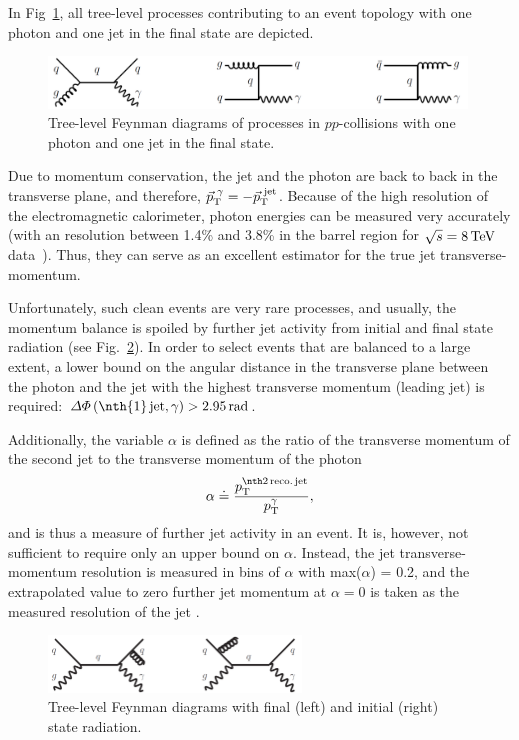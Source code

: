 In Fig~\ref{res:fig:FeynmanDiagrams}, all tree-level processes contributing to an event topology with one photon and one jet in the final state are depicted. 
\begin{figure}[b]
  \centering
      \includegraphics[width=0.99\textwidth]{figures/resolution/generalApproach/FeynmanDiagram.pdf}
  \caption{Tree-level Feynman diagrams of processes in $pp$-collisions with one photon and one jet in the final state.}  
  \label{res:fig:FeynmanDiagrams}
\end{figure}
Due to momentum conservation, the jet and the photon are back to back in the transverse plane, and therefore, $\vec{p}_{\text{T}}^{\,\,\gamma} = -\vec{p}_{\text{T}}^{\,\,\text{jet}}$. 
Because of the high resolution of the electromagnetic calorimeter, photon energies can be measured very accurately (with an resolution between 1.4\% and 3.8\% in the barrel region for $\sqrt{s}=8\,\text{Te}\kern-0.06667em\text{V}$ data~\cite{bib:CMS:PhotonIdentification_8TeV}).
Thus, they can serve as an excellent estimator for the true jet transverse-momentum.


Unfortunately, such clean events are very rare processes, and usually, the momentum balance is spoiled by further jet activity from initial and final state radiation (see Fig.~\ref{res:fig:FeynmanDiagramsWithRadiation}). 
In order to select events that are balanced to a large extent, a lower bound on the angular distance in the transverse plane between the photon and the jet with the highest transverse momentum (leading jet) is required: $\Delta\Phi \left(\text{\nth{1}\,jet,\,} \gamma \right)>2.95\,\unit{rad}$. 

Additionally, the variable $\alpha$ is defined as the ratio of the transverse momentum of the second jet to the transverse momentum of the photon
\begin{equation}
\label{res:eq:alphaDef}
\alpha \doteq \frac{\ptsecondrecojet}{\ptgamma},
\end{equation} 
and is thus a measure of further jet activity in an event. 
It is, however, not sufficient to require only an upper bound on $\alpha$. 
Instead, the jet transverse-momentum resolution is measured in bins of $\alpha$ with max($\alpha$) = 0.2, 
and the extrapolated value to zero further jet momentum at $\alpha=0$ is taken as the measured resolution of the jet \pt. %
\begin{figure}[t]
  \centering
      \includegraphics[width=0.60\textwidth]{figures/resolution/generalApproach/FeynmanDiagramsWithRadiation.pdf}
  \caption{Tree-level Feynman diagrams with final (left) and initial (right) state radiation.}  
  \label{res:fig:FeynmanDiagramsWithRadiation}
\end{figure}

